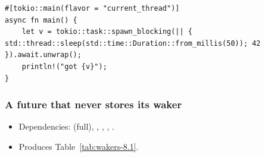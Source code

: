 \begin{lstlisting}[caption={A blocking job awaited on a single-threaded runtime.}, label=lst:wakers-A.2]
#[tokio::main(flavor = "current_thread")]
async fn main() {
    let v = tokio::task::spawn_blocking(|| { std::thread::sleep(std::time::Duration::from_millis(50)); 42 }).await.unwrap();
    println!("got {v}");
}
\end{lstlisting}

\subsubsection{A future that never stores its waker}

\begin{itemize}
    \item Dependencies:  (full), , , , .
    \item Produces Table~\ref{tab:wakers-8.1}.
\end{itemize}

